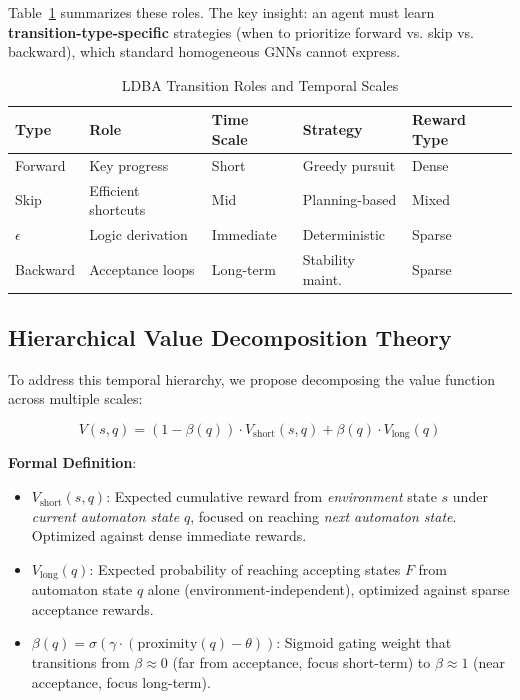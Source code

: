 \documentclass[conference]{IEEEtran}
\begin{document}
Table~\ref{tab:transition_types} summarizes these roles. The key insight: an agent must learn \textbf{transition-type-specific} strategies (when to prioritize forward vs. skip vs. backward), which standard homogeneous GNNs cannot express.

\begin{table}[t]
\centering
\caption{LDBA Transition Roles and Temporal Scales}
\label{tab:transition_types}
\begin{tabular}{@{}lllll@{}}
\toprule
\textbf{Type} & \textbf{Role} & \textbf{Time Scale} & \textbf{Strategy} & \textbf{Reward Type} \\ \midrule
Forward & Key progress & Short & Greedy pursuit & Dense \\
Skip & Efficient shortcuts & Mid & Planning-based & Mixed \\
$\epsilon$ & Logic derivation & Immediate & Deterministic & Sparse \\
Backward & Acceptance loops & Long-term & Stability maint. & Sparse \\ \bottomrule
\end{tabular}
\end{table}

\subsection{Hierarchical Value Decomposition Theory}

To address this temporal hierarchy, we propose decomposing the value function across multiple scales:

\begin{equation}
V(s, q) = (1 - \beta(q)) \cdot V_{\text{short}}(s, q) + \beta(q) \cdot V_{\text{long}}(q)
\label{eq:decomposition}
\end{equation}

\textbf{Formal Definition}:
\begin{itemize}
    \item $V_{\text{short}}(s, q)$: Expected cumulative reward from \emph{environment} state $s$ under \emph{current automaton state} $q$, focused on reaching \emph{next automaton state}. Optimized against dense immediate rewards. 
    \item $V_{\text{long}}(q)$: Expected probability of reaching accepting states $F$ from automaton state $q$ alone (environment-independent), optimized against sparse acceptance rewards.
    \item $\beta(q) = \sigma(\gamma \cdot (\text{proximity}(q) - \theta))$: Sigmoid gating weight that transitions from $\beta \approx 0$ (far from acceptance, focus short-term) to $\beta \approx 1$ (near acceptance, focus long-term).
\end{itemize}
\end{document}
